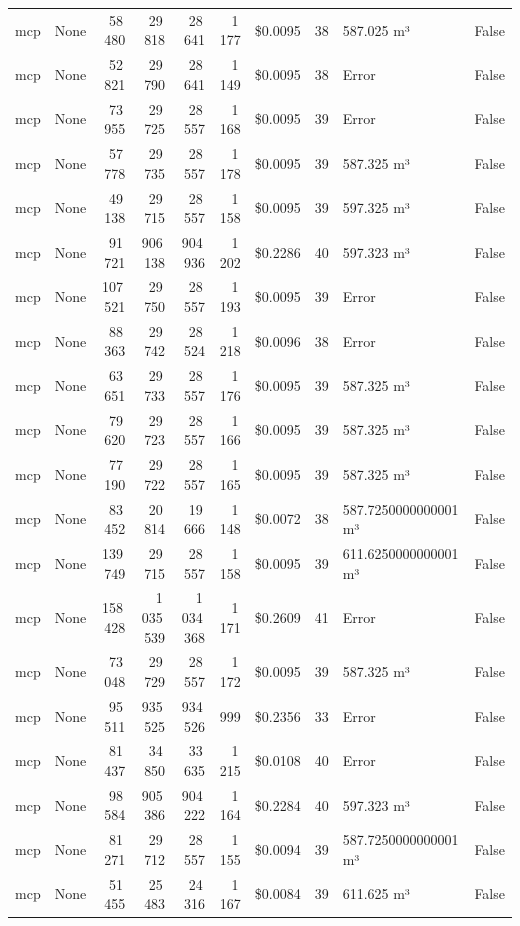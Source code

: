 \documentclass[a4paper,11pt]{article}
\begin{document}
\begin{table}[H]
{\begin{tabular}{l r r r r r r r l r}
mcp & None & 58\,480 & 29\,818 & 28\,641 & 1\,177 & \$0.0095 & 38 & 587.025 m³ & False \\
mcp & None & 52\,821 & 29\,790 & 28\,641 & 1\,149 & \$0.0095 & 38 & Error & False \\
mcp & None & 73\,955 & 29\,725 & 28\,557 & 1\,168 & \$0.0095 & 39 & Error & False \\
mcp & None & 57\,778 & 29\,735 & 28\,557 & 1\,178 & \$0.0095 & 39 & 587.325 m³ & False \\
mcp & None & 49\,138 & 29\,715 & 28\,557 & 1\,158 & \$0.0095 & 39 & 597.325 m³ & False \\
mcp & None & 91\,721 & 906\,138 & 904\,936 & 1\,202 & \$0.2286 & 40 & 597.323 m³ & False \\
mcp & None & 107\,521 & 29\,750 & 28\,557 & 1\,193 & \$0.0095 & 39 & Error & False \\
mcp & None & 88\,363 & 29\,742 & 28\,524 & 1\,218 & \$0.0096 & 38 & Error & False \\
mcp & None & 63\,651 & 29\,733 & 28\,557 & 1\,176 & \$0.0095 & 39 & 587.325 m³ & False \\
mcp & None & 79\,620 & 29\,723 & 28\,557 & 1\,166 & \$0.0095 & 39 & 587.325 m³ & False \\
mcp & None & 77\,190 & 29\,722 & 28\,557 & 1\,165 & \$0.0095 & 39 & 587.325 m³ & False \\
mcp & None & 83\,452 & 20\,814 & 19\,666 & 1\,148 & \$0.0072 & 38 & 587.7250000000001 m³ & False \\
mcp & None & 139\,749 & 29\,715 & 28\,557 & 1\,158 & \$0.0095 & 39 & 611.6250000000001 m³ & False \\
mcp & None & 158\,428 & 1\,035\,539 & 1\,034\,368 & 1\,171 & \$0.2609 & 41 & Error & False \\
mcp & None & 73\,048 & 29\,729 & 28\,557 & 1\,172 & \$0.0095 & 39 & 587.325 m³ & False \\
mcp & None & 95\,511 & 935\,525 & 934\,526 & 999 & \$0.2356 & 33 & Error & False \\
mcp & None & 81\,437 & 34\,850 & 33\,635 & 1\,215 & \$0.0108 & 40 & Error & False \\
mcp & None & 98\,584 & 905\,386 & 904\,222 & 1\,164 & \$0.2284 & 40 & 597.323 m³ & False \\
mcp & None & 81\,271 & 29\,712 & 28\,557 & 1\,155 & \$0.0094 & 39 & 587.7250000000001 m³ & False \\
mcp & None & 51\,455 & 25\,483 & 24\,316 & 1\,167 & \$0.0084 & 39 & 611.625 m³ & False \\

\end{tabular}}
\end{table}
\end{document}
